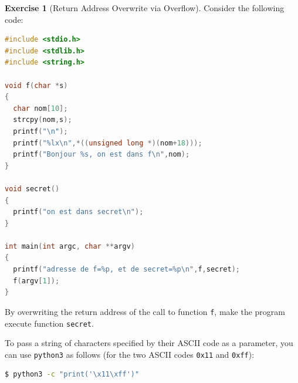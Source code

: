 \documentclass[a4paper,11pt]{article}
\theoremstyle{plain}
\theoremstyle{definition}
\newtheorem{exercice}{Exercise}
\begin{document}
\bigskip



\begin{exercice}[Return Address Overwrite via Overflow]
Consider the following code:
\begin{lstlisting}[language=C]
#include <stdio.h>
#include <stdlib.h>
#include <string.h>

void f(char *s)
{
  char nom[10];
  strcpy(nom,s);
  printf("\n");
  printf("%lx\n",*((unsigned long *)(nom+18)));
  printf("Bonjour %s, on est dans f\n",nom);
}

void secret()
{
  printf("on est dans secret\n");
}

int main(int argc, char **argv)
{
  printf("adresse de f=%p, et de secret=%p\n",f,secret);
  f(argv[1]);
}
\end{lstlisting}
By overwriting the return address of the call to function \texttt{f}, make the program execute function \texttt{secret}.

\begin{attention}
To pass a string of characters specified by their ASCII code as a parameter, you can use \texttt{python3} as follows (for the two ASCII codes \texttt{0x11} and \texttt{0xff}):
\begin{lstlisting}[language=bash,numbers=none]
$ python3 -c "print('\x11\xff')"
\end{lstlisting}
\end{attention}
\end{exercice}
\end{document}

